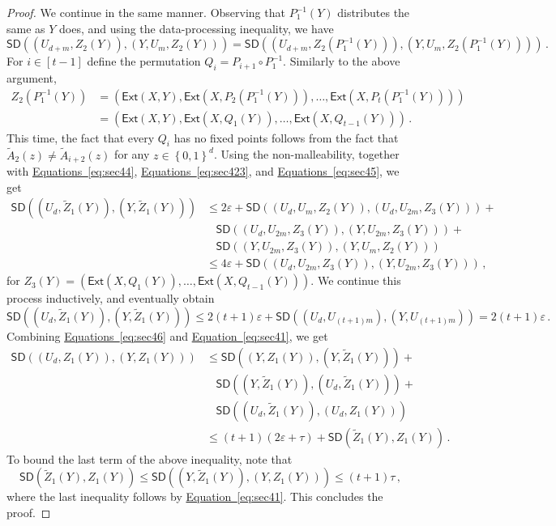\documentclass[11pt]{article}
\numberwithin{equation}{section}
\theoremstyle{definition}
\theoremstyle{plain}
\newcommand{\expeqref}[2]{\hyperref[#2]{#1~\eqref{#2}}}
\newcommand{\ext}{\mathsf{Ext}}
\newcommand{\eps}{\varepsilon}
\newcommand{\set}[1]{\left\{{#1}\right\}}
\newcommand{\B}{\set{0,1}}
\def\SD{\ensuremath{\mathsf{SD}}}
\begin{document}
\begin{proof}
We continue in the same manner. Observing that $P_{1}^{-1}(Y)$ distributes the same as $Y$
does, and using the data-processing inequality, we have
\begin{equation}\label{eq:sec45}
\SD((U_{d+m},Z_{2}(Y)),(Y,U_m,Z_{2}(Y))) = 
\SD((U_{d+m},Z_{2}(P_{1}^{-1}(Y))),(Y,U_m,Z_{2}(P_{1}^{-1}(Y))))\,.
\end{equation}
For $i \in [t-1]$ define the permutation $Q_i = P_{i+1} \circ P_1^{-1}$.
Similarly to the above argument,
\begin{align*}
Z_{2}(P_{1}^{-1}(Y)) &= \left( \ext(X,Y),\ext(X,P_{2}(P_{1}^{-1}(Y))),\ldots,\ext(X,P_{t}(P_{1}^{-1}(Y))) \right) \\
&= \left( \ext(X,Y),\ext(X,Q_{1}(Y)),\ldots,\ext(X,Q_{t-1}(Y)) \right)\,.
\end{align*}
This time, the fact that every $Q_i$ has no
fixed points follows from the fact that $\widetilde{A}_{2}(z) \neq \widetilde{A}_{i+2}(z)$ for
any $z \in \B^{d}$. Using the non-malleability, together with
\expeqref{Equations}{eq:sec44}, \expeqref{Equations}{eq:sec423},
and \expeqref{Equations}{eq:sec45}, we get 
\begin{align*}
\SD((U_d,\widetilde{Z}_1(Y)),(Y,\widetilde{Z}_1(Y))) &\le 2\eps + \SD((U_{d},U_{m},Z_{2}(Y)),(U_{d},U_{2m},Z_{3}(Y))) + \\
&~~~~ \SD((U_d,U_{2m},Z_{3}(Y)),(Y,U_{2m},Z_{3}(Y))) + \\
&~~~~ \SD((Y,U_{2m},Z_{3}(Y)),(Y,U_{m},Z_{2}(Y))) \\
&\le 4\eps + \SD((U_d,U_{2m},Z_{3}(Y)),(Y,U_{2m},Z_{3}(Y)))\,,
\end{align*}
for $Z_{3}(Y) = \left( \ext(X,Q_{1}(Y)),\ldots,\ext(X,Q_{t-1}(Y)) \right)$. We continue
this process inductively, and eventually obtain
\begin{equation}\label{eq:sec46}
\SD((U_d,\widetilde{Z}_1(Y)),(Y,\widetilde{Z}_1(Y))) \le 2(t+1)\eps + \SD((U_d,U_{(t+1)m}),(Y,U_{(t+1)m})) = 2(t+1)\eps\,.
\end{equation}
Combining \expeqref{Equations}{eq:sec46} and 
\expeqref{Equation}{eq:sec41}, we get
\begin{align*}
\SD((U_d,Z_1(Y)),(Y,Z_1(Y))) &\le \SD((Y,Z_1(Y)),(Y,\widetilde{Z}_{1}(Y))) + \\ &~~~~\SD((Y,\widetilde{Z}_1(Y)),(U_d,\widetilde{Z}_1(Y))) + \\
&~~~~\SD((U_d,\widetilde{Z}_1(Y)),(U_d,Z_{1}(Y))) \\
&\le (t+1)(2\eps+\tau) + \SD(\widetilde{Z}_1(Y),Z_{1}(Y))\,.
\end{align*}
To bound the last term of the above inequality, note that
\[
\SD(\widetilde{Z}_1(Y),Z_{1}(Y)) \le \SD((Y,\widetilde{Z}_1(Y)),(Y,Z_{1}(Y))) \le (t+1)\tau\,,
\]
where the last inequality follows by \expeqref{Equation}{eq:sec41}. This concludes the proof.
\end{proof}
\end{document}
